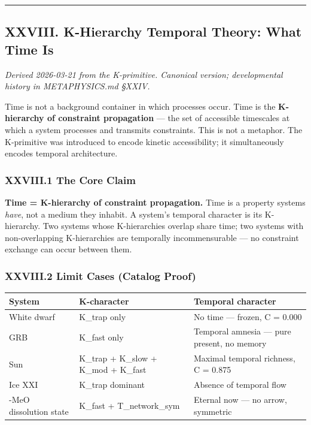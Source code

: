 \documentclass[12pt,a4paper]{article}
\begin{document}
\begin{center}
\rule{0.5\textwidth}{0.4pt}
\end{center}

\subsection{XXVIII. K-Hierarchy Temporal Theory: What Time Is}

\emph{Derived 2026-03-21 from the K-primitive. Canonical version; developmental history in METAPHYSICS.md §XXIV.}

Time is not a background container in which processes occur. Time is the \textbf{K-hierarchy of constraint propagation} --- the set of accessible timescales at which a system processes and transmits constraints. This is not a metaphor. The K-primitive was introduced to encode kinetic accessibility; it simultaneously encodes temporal architecture.

\subsubsection{XXVIII.1 The Core Claim}

\textbf{Time = K-hierarchy of constraint propagation.} Time is a property systems \emph{have}, not a medium they inhabit. A system's temporal character is its K-hierarchy. Two systems whose K-hierarchies overlap share time; two systems with non-overlapping K-hierarchies are temporally incommensurable --- no constraint exchange can occur between them.

\subsubsection{XXVIII.2 Limit Cases (Catalog Proof)}

\begin{table}[htbp]
\centering
\small
{}
\begin{tabularx}{\textwidth}{>{\centering\arraybackslash}X >{\centering\arraybackslash}X >{\centering\arraybackslash}X}
\toprule
\rowcolor{gray!25}\textbf{System} & \textbf{K-character} & \textbf{Temporal character} \\
\midrule
\rowcolors{1}{white}{gray!10}
White dwarf & K\_trap only & No time --- frozen, C = 0.000 \\
GRB & K\_fast only & Temporal amnesia --- pure present, no memory \\
Sun & K\_trap + K\_slow + K\_mod + K\_fast & Maximal temporal richness, C = 0.875 \\
Ice XXI & K\_trap dominant & Absence of temporal flow \\
5-MeO dissolution state & K\_fast + T\_network\_sym & Eternal now --- no arrow, symmetric \\
\bottomrule
\end{tabularx}
\end{table}
\end{document}
